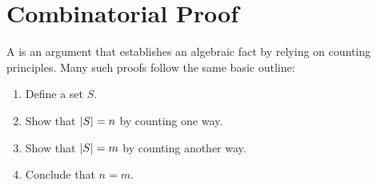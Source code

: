 \documentclass[12pt]{article}
\begin{document}


\section{Combinatorial Proof}

A  is an argument that establishes an
algebraic fact by relying on counting principles.  Many such proofs
follow the same basic outline:
%
\begin{enumerate}

\item Define a set $S$.

\item Show that $\left|S\right| = n$ by counting one way.

\item Show that $\left|S\right| = m$ by counting another way.

\item Conclude that $n = m$.

\end{enumerate}
\end{document}
